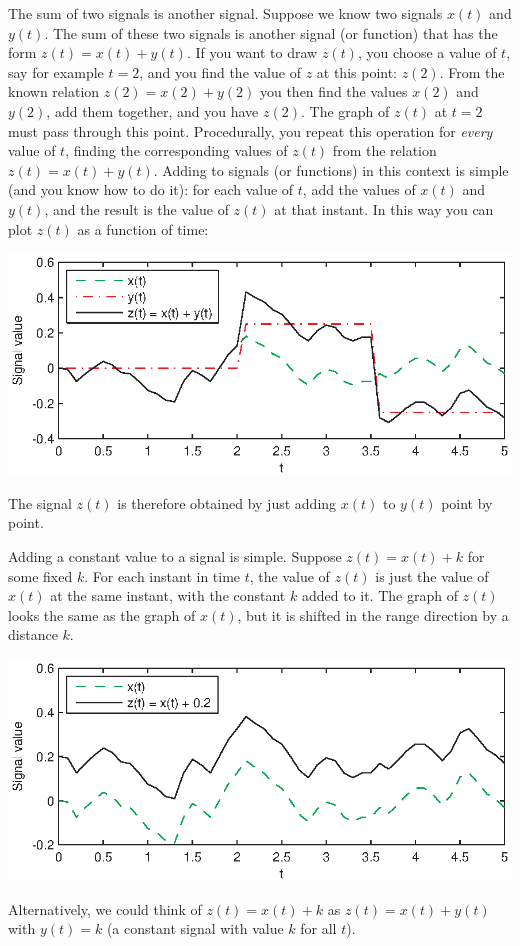 \documentclass[10pt]{beamer}
\begin{document}
The sum of two signals is another signal.  Suppose we know two signals $x(t)$ and $y(t)$.  The sum of these two signals is another signal (or function) that has the form $z(t) = x(t) + y(t)$.  If you want to draw $z(t)$, you choose a value of $t$, say for example $t=2$, and you find the value of $z$ at this point:  $z(2)$.  From the known relation $z(2) = x(2) + y(2)$ you then find the values $x(2)$ and $y(2)$, add them together, and you have $z(2)$.  The graph of $z(t)$ at $t=2$ must pass through this point.  Procedurally, you repeat this operation for {\em every} value of $t$, finding the corresponding values of $z(t)$ from the relation $z(t) = x(t) + y(t)$.  Adding to signals (or functions) in this context is simple (and you know how to do it):  for each value of $t$, add the values of $x(t)$ and $y(t)$, and the result is the value of $z(t)$ at that instant.  In this way you can plot $z(t)$ as a function of time:
\begin{center}
  \includegraphics{addsignalsex1}
\end{center}
The signal $z(t)$ is therefore obtained by just adding $x(t)$ to $y(t)$ point by point.

Adding a constant value to a signal is simple.  Suppose $z(t) = x(t) + k$ for some fixed $k$.  For each instant in time $t$, the value of $z(t)$ is just the value of $x(t)$ at the same instant, with the constant $k$ added to it.  The graph of $z(t)$ looks the same as the graph of $x(t)$, but it is shifted in the range direction by a distance $k$.
\begin{center}
  \includegraphics{addsignalsex2}
\end{center}Alternatively, we could think of $z(t) = x(t) + k$ as $z(t) = x(t) + y(t)$ with $y(t) = k$ (a constant signal with value $k$ for all $t$).  
\end{document}
